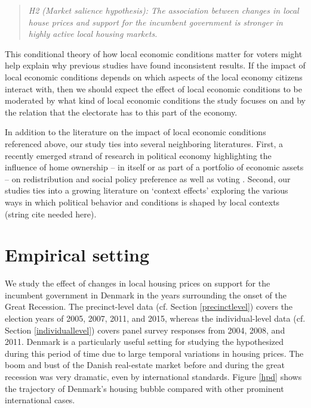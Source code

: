 \documentclass[12pt,a4paper]{article}
\begin{document}
	\begin{quote}
	\textit{H2 (Market salience hypothesis): The association between changes in local house prices and support for the incumbent government is stronger in highly active local housing markets.}
	\end{quote}
	
	This conditional theory of how local economic conditions matter for voters might help explain why previous studies have found inconsistent results. If the impact of local economic conditions depends on which aspects of the local economy citizens interact with, then we should expect the effect of local economic conditions to be moderated by what kind of local economic conditions the study focuses on and by the relation that the electorate has to this part of the economy.
	
	In addition to the literature on the impact of local economic conditions referenced above, our study ties into several neighboring literatures. First, a recently emerged strand of research in political economy highlighting the influence of home ownership -- in itself or as part of a portfolio of economic assets -- on redistribution and social policy preference as well as voting \citep{ansell2014political,nadeau2010patrimonial,stubager2013reaching}. Second, our studies ties into a growing literature on `context effects' exploring the various ways in which political behavior and conditions is shaped by local contexts (string cite needed here). 
	
	\section{Empirical setting}
	
	We study the effect of changes in local housing prices on support for the incumbent government in Denmark in the years surrounding the onset of the Great Recession. The precinct-level data (cf. Section \ref{precinctlevel}) covers the election years of 2005, 2007, 2011, and 2015, whereas the individual-level data (cf. Section \ref{individuallevel}) covers panel survey responses from 2004, 2008, and 2011. Denmark is a particularly useful setting for studying the hypothesized during this period of time due to large temporal variations in housing prices. The boom and bust of the Danish real-estate market before and during the great recession was very dramatic, even by international standards. Figure \ref{hpd} shows the trajectory of Denmark's housing bubble compared with other prominent international cases.
	
\end{document}
